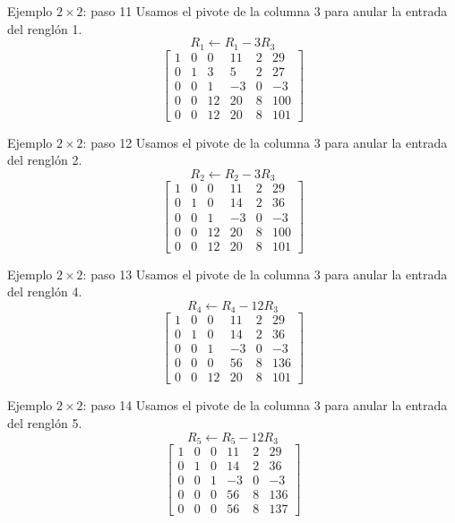 \documentclass[aspectratio=169,9pt]{beamer}
\theoremstyle{remark}
\begin{document}
\begin{frame}[t]{Ejemplo $2\times2$: paso 11}
Usamos el pivote de la columna 3 para anular la entrada del renglón 1.
\[
R_{1}\leftarrow R_{1}-3R_{3}
\]
\[
\left[\begin{array}{ccccc|c}
1 & 0 & 0 & 11 & 2 & 29\\
0 & 1 & 3 & 5 & 2 & 27\\
0 & 0 & 1 & -3 & 0 & -3\\
0 & 0 & 12 & 20 & 8 & 100\\
0 & 0 & 12 & 20 & 8 & 101
\end{array}\right]
\]
\end{frame}
\begin{frame}[t]{Ejemplo $2\times2$: paso 12}
Usamos el pivote de la columna 3 para anular la entrada del renglón 2.
\[
R_{2}\leftarrow R_{2}-3R_{3}
\]
\[
\left[\begin{array}{ccccc|c}
1 & 0 & 0 & 11 & 2 & 29\\
0 & 1 & 0 & 14 & 2 & 36\\
0 & 0 & 1 & -3 & 0 & -3\\
0 & 0 & 12 & 20 & 8 & 100\\
0 & 0 & 12 & 20 & 8 & 101
\end{array}\right]
\]
\end{frame}
\begin{frame}[t]{Ejemplo $2\times2$: paso 13}
Usamos el pivote de la columna 3 para anular la entrada del renglón 4.
\[
R_{4}\leftarrow R_{4}-12R_{3}
\]
\[
\left[\begin{array}{ccccc|c}
1 & 0 & 0 & 11 & 2 & 29\\
0 & 1 & 0 & 14 & 2 & 36\\
0 & 0 & 1 & -3 & 0 & -3\\
0 & 0 & 0 & 56 & 8 & 136\\
0 & 0 & 12 & 20 & 8 & 101
\end{array}\right]
\]
\end{frame}
\begin{frame}[t]{Ejemplo $2\times2$: paso 14}
Usamos el pivote de la columna 3 para anular la entrada del renglón 5.
\[
R_{5}\leftarrow R_{5}-12R_{3}
\]
\[
\left[\begin{array}{ccccc|c}
1 & 0 & 0 & 11 & 2 & 29\\
0 & 1 & 0 & 14 & 2 & 36\\
0 & 0 & 1 & -3 & 0 & -3\\
0 & 0 & 0 & 56 & 8 & 136\\
0 & 0 & 0 & 56 & 8 & 137
\end{array}\right]
\]
\end{frame}
\end{document}
